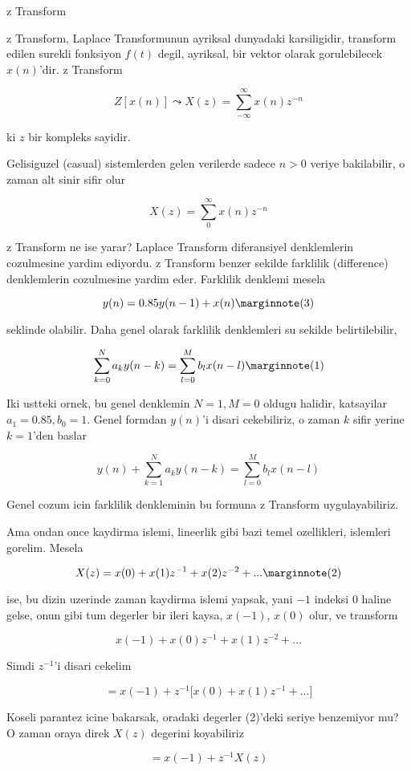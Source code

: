 \documentclass[12pt,fleqn]{article}\usepackage{../common}
\begin{document}
z Transform 

z Transform, Laplace Transformunun ayriksal dunyadaki karsiligidir,
transform edilen surekli fonksiyon $f(t)$ degil, ayriksal, bir vektor
olarak gorulebilecek $x(n)$'dir. z Transform

$$ Z[x(n)] \leadsto X(z) = \sum_{-\infty}^{\infty} x(n)z^{-n}  $$

ki $z$ bir kompleks sayidir. 

Gelisiguzel (casual) sistemlerden gelen verilerde sadece $n>0$ veriye
bakilabilir, o zaman alt sinir sifir olur

$$ X(z) = \sum_{0}^{\infty} x(n)z^{-n}  $$

z Transform ne ise yarar? Laplace Transform diferansiyel denklemlerin
cozulmesine yardim ediyordu. z Transform benzer sekilde farklilik
(difference) denklemlerin cozulmesine yardim eder. Farklilik denklemi
mesela

$$ y(n) = 0.85 y(n-1) + x(n) 
\mlabel{3}
$$

seklinde olabilir. Daha genel olarak farklilik denklemleri su sekilde
belirtilebilir,

$$ \sum_{k=0}^N a_k y(n-k) = \sum_{l=0}^M b_l x(n-l) 
\mlabel{1}
$$

Iki ustteki ornek, bu genel denklemin $N=1,M=0$ oldugu halidir, katsayilar
$a_1 = 0.85,b_0=1$. Genel formdan $y(n)$'i disari cekebiliriz, o zaman
$k$ sifir yerine $k=1$'den baslar

$$ y(n) + \sum_{k=1}^N a_k y(n-k) = \sum_{l=0}^M b_l x(n-l) $$

Genel cozum icin farklilik denkleminin bu formuna z Transform
uygulayabiliriz. 

Ama ondan once kaydirma islemi, lineerlik gibi bazi temel ozellikleri,
islemleri gorelim. Mesela

$$ X(z) = x(0) + x(1)z^{-1} + x(2) z^{-2} + ... 
\mlabel{2}
$$

ise, bu dizin uzerinde zaman kaydirma islemi yapsak, yani $-1$ indeksi
$0$ haline gelse, onun gibi tum degerler bir ileri kaysa, $x(-1)$,
$x(0)$ olur, ve transform

$$ x(-1) + x(0)z^{-1} + x(1) z^{-2} + ...$$

Simdi $z^{-1}$'i disari cekelim

$$ = x(-1) + z^{-1} \bigg[ x(0) + x(1) z^{-1} + ... \bigg] $$

Koseli parantez icine bakarsak, oradaki degerler (2)'deki seriye benzemiyor
mu? O zaman oraya direk $X(z)$ degerini koyabiliriz

$$ = x(-1) + z^{-1}X(z)$$
\end{document}
